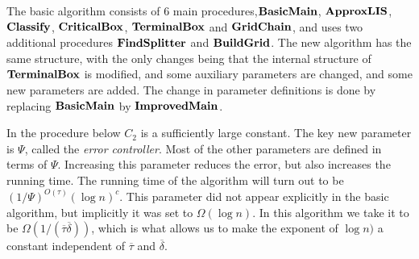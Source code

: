 \documentclass{acmsmall}
\newcommand{\terminalbox}{{\rm{\bf TerminalBox}}}
\newcommand{\deltapar}{\overline{\delta}}
\newcommand{\taupar}{\overline{\tau}}
\newcommand{\errorcont}{\Psi}
\newcommand{\classify}{{\rm {\bf Classify}}}
\newcommand{\basicmain}{{\rm {\bf BasicMain}}}
\newcommand{\improvedmain}{{\rm {\bf ImprovedMain}}}
\newcommand{\approxlis}{{\rm {\bf ApproxLIS}}}
\newcommand{\critbox}{{\rm {\bf CriticalBox}}}
\newcommand{\findsplitter}{{\rm {\bf FindSplitter}}}
\newcommand{\buildgrid}{{\rm {\bf BuildGrid}}}
\newcommand{\gridchain}{{\rm {\bf GridChain}}}
\begin{document}
The basic algorithm consists of 6 main procedures,$\basicmain$, $\approxlis$, $\classify$, $\critbox$, $\terminalbox$ and $\gridchain$,
and uses two additional procedures $\findsplitter$ and $\buildgrid$.
The new algorithm has the same structure, with the only changes being that  the internal structure of
$\terminalbox$ is modified, and some  auxiliary parameters are changed, and some new parameters are added.
The change in parameter definitions is done by replacing $\basicmain$ by $\improvedmain$.


In the procedure below $C_2$ is a sufficiently large constant.
The key new parameter is $\errorcont$, called the {\em error controller}.  Most of the other parameters are defined in terms of $\errorcont$.  Increasing this parameter reduces the error, but also increases the
running time.  The running time of the algorithm will turn out to be $(1/\errorcont)^{O(\tau)}(\log n)^c$.
This parameter did not appear explicitly in 
the basic algorithm, but implicitly it was set to 
$\Omega(\log n)$.  In this algorithm we take it to be $\Omega(1/(\taupar\deltapar))$, which is what allows us
to make the exponent of $\log n)$ a constant independent of $\taupar$ and $\deltapar$.


 
\end{document}
